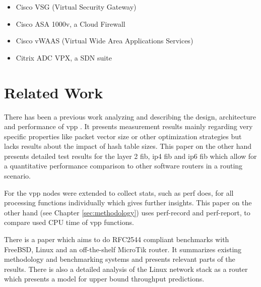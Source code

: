 \begin{itemize}
	\item Cisco VSG (Virtual Security Gateway)
	\item Cisco ASA 1000v, a Cloud Firewall
	\item Cisco vWAAS (Virtual Wide Area Applications Services)
	\item Citrix ADC VPX, a SDN suite
\end{itemize}


\chapter{Related Work}


There has been a previous work analyzing and describing the design,
architecture and performance of \Ac{vpp} \cite{linguaglossa2017high}.
It presents measurement results mainly regarding very specific
properties like packet vector size or other optimization strategies
but lacks results about the impact of hash table sizes. This paper on
the other hand presents detailed test results for the layer 2
\Ac{fib}, \Ac{ip4} \Ac{fib} and \Ac{ip6} \Ac{fib} which allow for a
quantitative performance comparison to other software routers in a
routing scenario.


For \cite{linguaglossa2017high} the \Ac{vpp} nodes were extended to
collect stats, such as \Ac{perf} does, for all processing functions
individually which gives further insights. This paper on the other
hand (see Chapter \ref{sec:methodology}) uses perf-record and perf-report, to compare used CPU time of \Ac{vpp} functions.



There is a paper \cite{revisiting-benchmarking:1} which aims to do
RFC2544 compliant benchmarks with FreeBSD, Linux and an off-the-shelf
MicroTik router. It summarizes existing methodology and benchmarking
systems and presents relevant parts of the results. There is also a
detailed analysis \cite{raumer2015performance} of the Linux network
stack as a router which presents a model for upper bound throughput
predictions.

